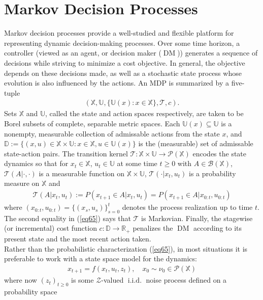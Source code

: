 \documentclass[12pt, oneside]{report}
\newcommand{\mbb}[1]{\mathbb{#1}}
\newcommand{\1}[1]{\mathbbm{1}_{\{#1\}}}
\newcommand{\mc}[1]{\mathcal{#1}}
\DeclareMathOperator{\iid}{i.i.d.}
\DeclareMathOperator{\DM}{DM} \DeclareMathOperator{\argmin}{argmin}
\theoremstyle{definition}
\begin{document}
\section{Markov Decision Processes}\label{app1}
Markov decision processes provide a well-studied and flexible platform for
representing dynamic decision-making processes. Over some time horizon, a
controller (viewed as an agent, or decision maker ($\DM$)) generates a sequence of decisions
while striving to minimize a cost objective. In general, the objective depends
on these decisions made, as well as a stochastic state process whose evolution is also influenced by the actions.
An MDP is summarized by a five-tuple
\begin{align}
    (\mbb{X},\mbb{U},\{\mbb{U}(x):x\in\mbb{X}\},\mc{T},c).\label{eq9}
\end{align}
Sets $\mbb{X}$ and $\mbb{U}$, called the state and action spaces
respectively, are taken to be Borel subsets of complete, separable metric
spaces. Each $\mbb{U}(x)\subseteq\mbb{U}$ is a nonempty, measurable
collection of admissable actions from the state $x$, and
$\mbb{D}:=\{(x,u)\in\mbb{X}\times\mbb{U}:x\in\mbb{X},u\in\mbb{U}(x)\}$ is
the (measurable) set of admissable state-action pairs. The transition kernel
$\mc{T}:\mbb{X}\times\mbb{U}\rightarrow\mc{P}(\mbb{X})$ encodes the state
dynamics so that for $x_t\in\mbb{X}$, $u_t\in\mbb{U}$ at some time $t\geq 0$
with $A\in\mc{B}(\mbb{X})$, $\mc{T}(A|\cdot,\cdot)$ is a measurable function
on $\mbb{X}\times\mbb{U}$, $\mc{T}(\cdot|x_t,u_t)$ is a probability measure on $\mbb{X}$ and
\begin{align}
    \mc{T}(A|x_t,u_t):=P(x_{t+1}\in A|x_t,u_t)=P(x_{t+1}\in A|x_{0:t},u_{0:t})\label{eq65}
\end{align}
where $(x_{0:t},u_{0:t})=\{(x_s,u_s)\}_{s=0}^t$ denotes the process realization
up to time $t$. The second equality in (\ref{eq65}) says that $\mc{T}$ is
Markovian. Finally, the stagewise (or incremental) cost function
$c:\mbb{D}\rightarrow\mbb{R}_+$ penalizes the $\DM$ according to its present
state and the most recent action taken.\\[5pt]
\indent Rather than the probabilistic characterization (\ref{eq65}), in most
situations it is preferable to work with a state space model for the dynamics:
\begin{align}
    x_{t+1}=f(x_t,u_t,z_t),\quad x_0\sim \nu_0\in\mc{P}(\mbb{X})\label{eq66}
\end{align}
where now $(z_t)_{t\geq 0}$ is some $\mc{Z}$-valued $\iid$ noise process defined on a probability space
\end{document}
